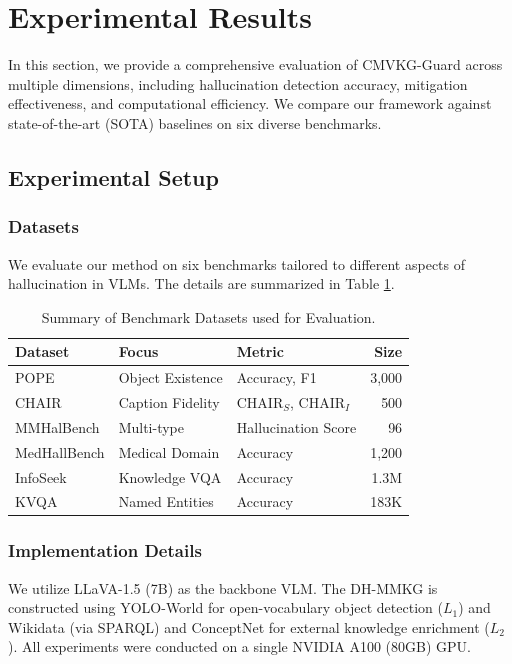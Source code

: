 \section{Experimental Results}
\label{sec:results}

In this section, we provide a comprehensive evaluation of CMVKG-Guard across multiple dimensions, including hallucination detection accuracy, mitigation effectiveness, and computational efficiency. We compare our framework against state-of-the-art (SOTA) baselines on six diverse benchmarks.

\subsection{Experimental Setup}

\subsubsection{Datasets}
We evaluate our method on six benchmarks tailored to different aspects of hallucination in VLMs. The details are summarized in Table \ref{tab:datasets}.

\begin{table}[htbp]
\centering
\caption{Summary of Benchmark Datasets used for Evaluation.}
\label{tab:datasets}

\begin{tabular}{l l l r}
\hline
\textbf{Dataset} & \textbf{Focus} & \textbf{Metric} & \textbf{Size} \\
\hline
POPE \cite{li2023pope} & Object Existence & Accuracy, F1 & 3,000 \\
CHAIR \cite{rohrbach2018object} & Caption Fidelity & CHAIR$_S$, CHAIR$_I$ & 500 \\
MMHalBench \cite{sun2024mmhal} & Multi-type & Hallucination Score & 96 \\
MedHallBench \cite{zuo2024medhallbench} & Medical Domain & Accuracy & 1,200 \\
InfoSeek \cite{chen2024extracting} & Knowledge VQA & Accuracy & 1.3M \\
KVQA \cite{shah2019kvqa} & Named Entities & Accuracy & 183K \\
\hline
\end{tabular}

\end{table}

\subsubsection{Implementation Details}
We utilize LLaVA-1.5 (7B) \cite{liu2023llava} as the backbone VLM. The DH-MMKG is constructed using YOLO-World for open-vocabulary object detection ($L_1$) and Wikidata (via SPARQL) and ConceptNet for external knowledge enrichment ($L_2$). All experiments were conducted on a single NVIDIA A100 (80GB) GPU.

